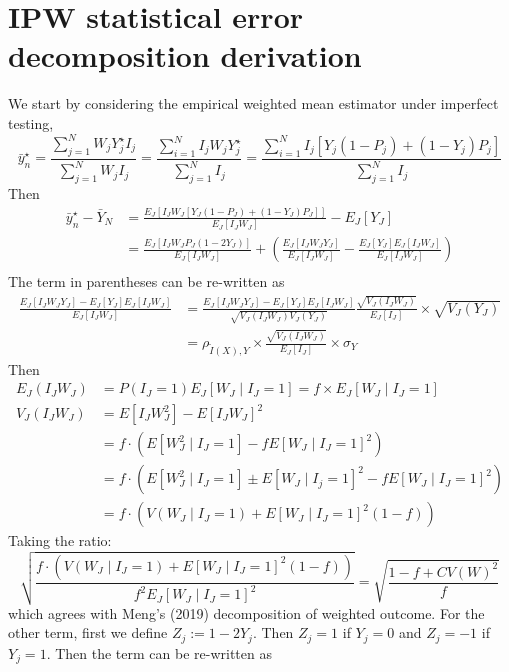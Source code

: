 \documentclass[11pt]{amsart}
\numberwithin{equation}{section}
\theoremstyle{plain}
\begin{document}
\section{IPW statistical error decomposition derivation}
\label{app:ipwderivation}
We start by considering the empirical weighted mean estimator under imperfect testing,
$$
\bar y_n^\star = \frac{\sum_{j=1}^N W_j Y_j^\star I_j}{\sum_{j=1}^N W_j I_j} = \frac{\sum_{i=1}^N  I_j W_j Y_j^\star }{\sum_{j=1}^N  I_j } = \frac{\sum_{i=1}^N  I_j \left[ Y_j (1-P_j) + (1-Y_j) P_j \right]}{\sum_{j=1}^N  I_j }
$$
Then
$$
\begin{aligned}
\bar y_n^\star  - \bar Y_N &= \frac{E_J \left[ I_J W_J \left[ Y_J (1-P_J) + (1-Y_J) P_J \right] \right]}{E_J [ I_J W_J ] } - E_J[Y_J] \\
&= \frac{E_J \left[ I_J W_J P_J (1-2Y_J) \right]}{E_J [ I_J W_J ] } + \left( \frac{E_J [I_J W_J Y_J]}{E_J [ I_J W_J ] } - \frac{E_J[Y_J] E_J[I_J W_J]}{E_J[I_J W_J]} \right) \\
\end{aligned}
$$
The term in parentheses can be re-written as
$$
\begin{aligned}
\frac{E_J [I_J W_J Y_J]- E_J[Y_J] E_J[I_J W_J]}{E_J[I_J W_J]} &=  \frac{E_J [I_J W_J Y_J]- E_J[Y_J] E_J[I_J W_J]}{\sqrt{V_J(I_J W_J) V_J(Y_J)}} \frac{\sqrt{V_J(I_J W_J)}}{E_J[I_J]} \times \sqrt{V_J(Y_J)} \\
&= \rho_{\tilde I (X),Y} \times \frac{\sqrt{V_J(I_J W_J)}}{E_J[I_J]} \times \sigma_Y
\end{aligned}
$$
Then
\begin{align*}
E_J (I_J W_J) &= P(I_J = 1) E_J [W_J \mid I_J = 1] = f \times E_J [W_J \mid I_J = 1] \\
V_J(I_J W_J) &= E[ I_J W_J^2] - E[I_J W_J]^2 \\
&= f \cdot \left( E [W_J^2 \mid I_J = 1] - f E[W_J \mid I_J = 1 ]^2 \right) \\
&= f \cdot \left( E [W_J^2 \mid I_J = 1] \pm E[W_J \mid I_j = 1]^2 - f E[W_J \mid I_J = 1 ]^2 \right) \\
&= f \cdot \left( V (W_J \mid I_J = 1) + E[W_J \mid I_J = 1]^2 (1-f) \right)
\end{align*}
Taking the ratio:
$$
\sqrt{\frac{f \cdot \left( V (W_J \mid I_J = 1) + E[W_J \mid I_J = 1]^2 (1-f) \right)}{f^2 E_J [W_J \mid I_J = 1]^2}} = \sqrt{\frac{1 - f + CV(W)^2}{f}}
$$
which agrees with Meng's (2019) decomposition of weighted outcome. For the other term, first we define $Z_j := 1 - 2 Y_j $. Then $Z_j = 1$ if $Y_j = 0$ and $Z_j = -1$ if $Y_j = 1$. Then the term can be re-written as
\end{document}
